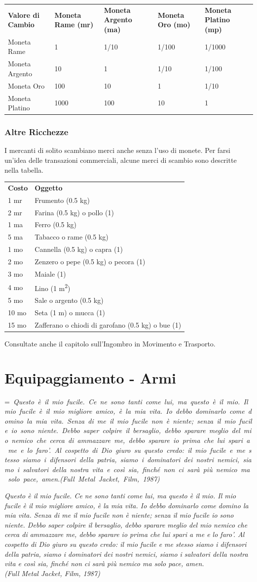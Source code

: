 \documentclass[a4paper,11pt,twoside,openany]{book}
\makeatletter
\newcommand{\mybox}[1]{%
	\setbox0=\hbox{#1}%
	\setlength{\@tempdima}{\dimexpr\wd0+13pt}%
	\begin{tcolorbox}[boxrule=0.5pt,arc=4pt, breakable,enhanced,
		left=6pt,right=6pt,top=6pt,bottom=6pt,boxsep=0pt,width=\@tempdima]
		#1
	\end{tcolorbox}
}
\makeatother
\begin{document}
{%
\begin{tabular}{L{3cm} L{3cm} L{3cm} L{3cm} L{3cm}}
\toprule
\textbf{Valore di Cambio} & \textbf{Moneta Rame (mr)} & \textbf{Moneta Argento (ma)} & \textbf{Moneta Oro (mo)} & \textbf{Moneta Platino (mp)}\tabularnewline
Moneta Rame & 1 & 1/10 & 1/100 & 1/1000\tabularnewline
Moneta Argento & 10 & 1 & 1/10 & 1/100\tabularnewline
Moneta Oro & 100 & 10 & 1 & 1/10\tabularnewline
Moneta Platino & 1000 & 100 & 10 & 1\tabularnewline
\end{tabular}

\bigskip

\subsubsection{Altre Ricchezze}

I mercanti di solito scambiano merci anche senza l'uso di monete.
Per farsi un'idea delle transazioni commerciali, alcune merci di scambio sono descritte nella tabella.

\bigskip

\begin{tabular}{ll}
\toprule
\textbf{Costo} & \textbf{Oggetto}\tabularnewline
1 mr & Frumento (0.5 kg)\tabularnewline
2 mr & Farina (0.5 kg) o pollo (1)\tabularnewline
1 ma & Ferro (0.5 kg)\tabularnewline
5 ma & Tabacco o rame (0.5 kg)\tabularnewline
1 mo & Cannella (0.5 kg) o capra (1)\tabularnewline
2 mo & Zenzero o pepe (0.5 kg) o pecora (1)\tabularnewline
3 mo & Maiale (1)\tabularnewline
4 mo & Lino (1 m\textsuperscript{2})\tabularnewline
5 mo & Sale o argento (0.5 kg)\tabularnewline
10 mo & Seta (1 m) o mucca (1)\tabularnewline
15 mo & Zafferano o chiodi di garofano (0.5 kg) o bue (1)\tabularnewline
\end{tabular}

Consultate anche il capitolo sull'Ingombro in Movimento e Trasporto.

\pagebreak

\section{Equipaggiamento - Armi}

\label{equipaggiamento---armi}
\mybox{\textit{
Questo è il mio fucile. Ce ne sono tanti come lui, ma questo è il mio. Il mio fucile è il mio migliore amico, è la mia vita. Io debbo dominarlo come domino la mia vita. Senza di me il mio fucile non è niente; senza il mio fucile io sono niente. Debbo saper colpire il bersaglio, debbo sparare meglio del mio nemico che cerca di ammazzare me, debbo sparare io prima che lui spari a me e lo faro'. Al cospetto di Dio giuro su questo credo: il mio fucile e me stesso siamo i difensori della patria, siamo i dominatori dei nostri nemici, siamo i salvatori della nostra vita e così sia, finché non ci sarà più nemico ma solo pace, amen.
\\
(Full Metal Jacket, Film, 1987)
}}\medskip

}
\end{document}
